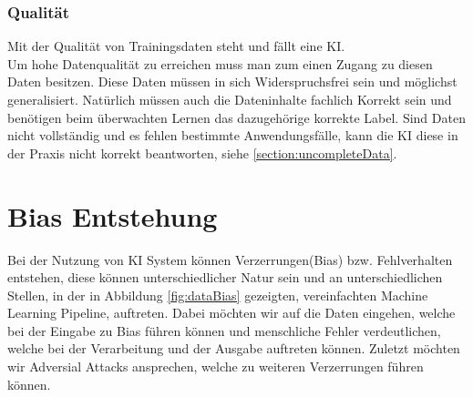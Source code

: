 \documentclass[12pt,oneside,a4paper,parskip]{scrbook}
\begin{document}
\subsection{Qualität}
\label{section:DataQuality}
Mit der Qualität von Trainingsdaten steht und fällt eine KI. \\Um hohe Datenqualität zu erreichen muss man zum einen Zugang zu diesen Daten besitzen. Diese Daten müssen in sich Widerspruchsfrei sein und möglichst generalisiert. Natürlich müssen auch die Dateninhalte fachlich Korrekt sein und benötigen beim überwachten Lernen das dazugehörige korrekte Label. Sind Daten nicht vollständig und es fehlen bestimmte Anwendungsfälle, kann die KI diese in der Praxis nicht korrekt beantworten, siehe \ref{section:uncompleteData}.




\chapter{Bias Entstehung}
Bei der Nutzung von KI System können Verzerrungen(Bias) bzw. Fehlverhalten entstehen, diese können unterschiedlicher Natur sein und an unterschiedlichen Stellen, in der in Abbildung \ref{fig:dataBias} gezeigten, vereinfachten Machine Learning Pipeline, auftreten. Dabei möchten wir auf die Daten eingehen, welche bei der Eingabe zu Bias führen können und menschliche Fehler verdeutlichen, welche bei der Verarbeitung und der Ausgabe auftreten können. Zuletzt möchten wir Adversial Attacks ansprechen, welche zu weiteren Verzerrungen führen können.
\end{document}
